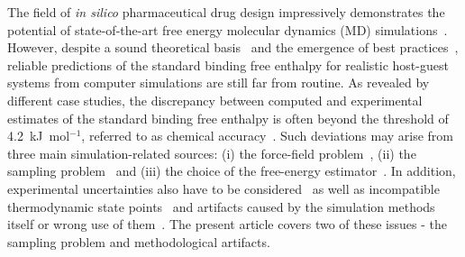 \documentclass[9pt,lessons]{livecoms}
\begin{document}
The field of \textit{in silico} pharmaceutical drug design impressively demonstrates  the potential of state-of-the-art free energy molecular dynamics (MD) simulations~\cite{leelananda2016computational}.
However, despite a sound theoretical basis~\cite{gilson1997statistical, boresch2003absolute} and the emergence of best practices~\cite{pohorille2010good}, 
reliable predictions of the standard binding free enthalpy for realistic host-guest systems from computer simulations are still far from routine. 
As revealed by different case studies, the discrepancy between computed and experimental estimates of the standard binding free enthalpy is often beyond the threshold of 4.2~kJ~mol$^{-1}$, 
referred to as chemical accuracy~\cite{pople1999nobel}.
Such deviations may arise from three main simulation-related sources: 
(i) the force-field problem~\cite{rocklin2013calculating,yin2015toward}, (ii) the sampling problem~\cite{zuckerman2011equilibrium} and (iii) the choice of the free-energy estimator~\cite{christ2010basic}. 
In addition, experimental uncertainties also have to be considered~\cite{van2006biomolecular} as well as incompatible thermodynamic state points~\cite{konig2012predicting} 
and artifacts caused by the simulation methods itself or wrong use of them~\cite{wong2016good}.
The present article covers two of these issues - the sampling problem and methodological artifacts.
\end{document}
